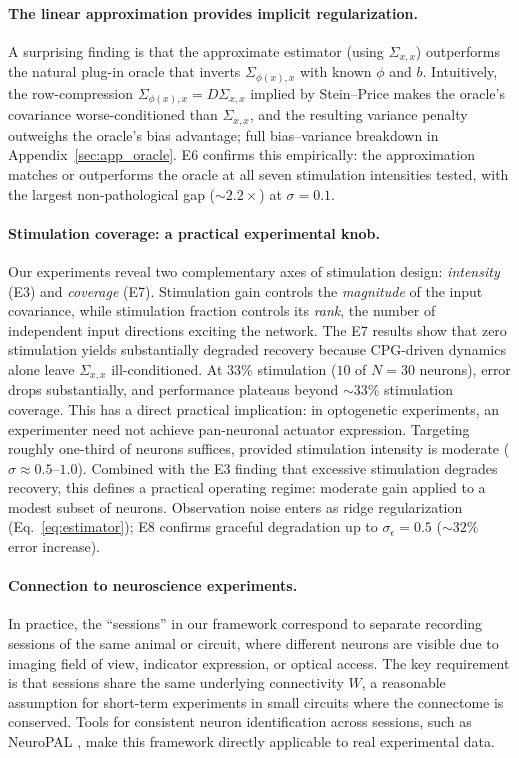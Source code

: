 \documentclass{article}
\begin{document}
\paragraph{The linear approximation provides implicit regularization.}
A surprising finding is that the approximate estimator (using $\Sigma_{x,x}$) outperforms the natural plug-in oracle that inverts $\Sigma_{\phi(x),x}$ with known $\phi$ and $b$.
Intuitively, the row-compression $\Sigma_{\phi(x),x} = D \Sigma_{x,x}$ implied by Stein--Price makes the oracle's covariance worse-conditioned than $\Sigma_{x,x}$, and the resulting variance penalty outweighs the oracle's bias advantage; full bias--variance breakdown in Appendix~\ref{sec:app_oracle}.
E6 confirms this empirically: the approximation matches or outperforms the oracle at all seven stimulation intensities tested, with the largest non-pathological gap ($\sim 2.2\times$) at $\sigma = 0.1$.

\paragraph{Stimulation coverage: a practical experimental knob.}
Our experiments reveal two complementary axes of stimulation design: \emph{intensity} (E3) and \emph{coverage} (E7).
Stimulation gain controls the \emph{magnitude} of the input covariance, while stimulation fraction controls its \emph{rank}, the number of independent input directions exciting the network.
The E7 results show that zero stimulation yields substantially degraded recovery because CPG-driven dynamics alone leave $\Sigma_{x,x}$ ill-conditioned.
At $33\%$ stimulation ($10$ of $N=30$ neurons), error drops substantially, and performance plateaus beyond $\sim 33\%$ stimulation coverage.
This has a direct practical implication: in optogenetic experiments, an experimenter need not achieve pan-neuronal actuator expression. Targeting roughly one-third of neurons suffices, provided stimulation intensity is moderate ($\sigma \approx 0.5$--$1.0$).
Combined with the E3 finding that excessive stimulation degrades recovery, this defines a practical operating regime: moderate gain applied to a modest subset of neurons.
Observation noise enters as ridge regularization (Eq.~\eqref{eq:estimator}); E8 confirms graceful degradation up to $\sigma_\epsilon = 0.5$ ($\sim 32\%$ error increase).

\paragraph{Connection to neuroscience experiments.}
In practice, the ``sessions'' in our framework correspond to separate recording sessions of the same animal or circuit, where different neurons are visible due to imaging field of view, indicator expression, or optical access.
The key requirement is that sessions share the same underlying connectivity $W$, a reasonable assumption for short-term experiments in small circuits where the connectome is conserved.
Tools for consistent neuron identification across sessions, such as NeuroPAL \citep{yemini2021neuropal}, make this framework directly applicable to real experimental data.
\end{document}
